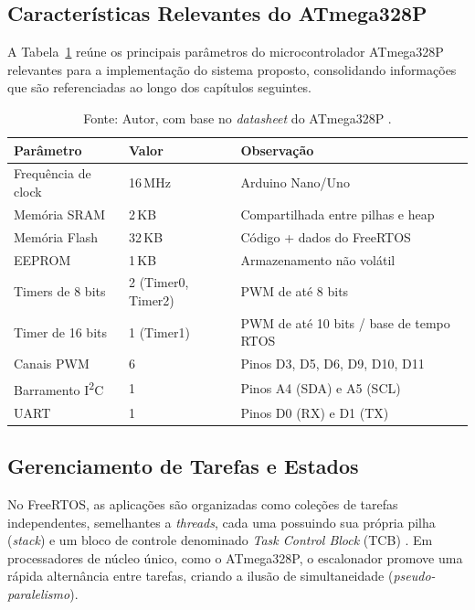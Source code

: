 \documentclass[repeatfields,xlists,xpacks,oneside]{ufrgscca}
\newcommand{\IIC}{I\textsuperscript{2}C}
\begin{document}
\subsection{Características Relevantes do ATmega328P}

A Tabela~\ref{tab:atmega_params} reúne os principais parâmetros do microcontrolador ATmega328P
relevantes para a implementação do sistema proposto, consolidando informações que são referenciadas
ao longo dos capítulos seguintes.

\begin{table}[htbp]
\centering
\caption{Parâmetros relevantes do microcontrolador ATmega328P.}
\label{tab:atmega_params}
\begin{tabular}{lll}
\toprule
\textbf{Parâmetro} & \textbf{Valor} & \textbf{Observação} \\
\midrule
Frequência de clock     & 16\,MHz       & Arduino Nano/Uno \\
Memória SRAM            & 2\,KB         & Compartilhada entre pilhas e heap \\
Memória Flash           & 32\,KB        & Código + dados do FreeRTOS \\
EEPROM                  & 1\,KB         & Armazenamento não volátil \\
Timers de 8 bits        & 2 (Timer0, Timer2) & PWM de até 8 bits \\
Timer de 16 bits        & 1 (Timer1)    & PWM de até 10 bits / base de tempo RTOS \\
Canais PWM              & 6             & Pinos D3, D5, D6, D9, D10, D11 \\
Barramento \IIC{}       & 1             & Pinos A4 (SDA) e A5 (SCL) \\
UART                    & 1             & Pinos D0 (RX) e D1 (TX) \\
\bottomrule
\end{tabular}
\caption*{\footnotesize Fonte: Autor, com base no \textit{datasheet} do ATmega328P \cite{atmel_atmega328p}.}
\end{table}

\subsection{Gerenciamento de Tarefas e Estados}

No FreeRTOS, as aplicações são organizadas como coleções de tarefas independentes, semelhantes a \textit{threads}, cada uma possuindo sua própria pilha (\textit{stack}) e um bloco de controle denominado \textit{Task Control Block} (TCB) \cite{SPOHN:FreeRTOS-Arduino-2019}. Em processadores de núcleo único, como o ATmega328P, o escalonador promove uma rápida alternância entre tarefas, criando a ilusão de simultaneidade (\textit{pseudo-paralelismo}).
\end{document}

